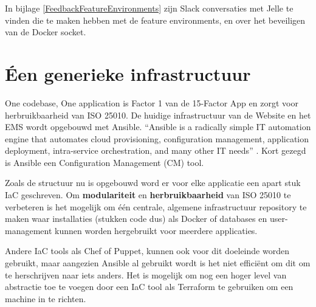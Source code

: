 
In bijlage \ref{FeedbackFeatureEnvironments} zijn Slack conversaties met Jelle te vinden die te maken hebben met de feature environments, en over het beveiligen van de Docker socket.

\section{Éen generieke infrastructuur}
One codebase, One application is Factor 1 van de 15-Factor App en zorgt voor herbruikbaarheid van ISO 25010. De huidige infrastructuur van de Website en het EMS wordt opgebouwd met Ansible. \enquote{Ansible is a radically simple IT automation engine that automates cloud provisioning, configuration management, application deployment, intra-service orchestration, and many other IT needs} \parencite{Ansible}. Kort gezegd is Ansible een Configuration Management (CM) tool.

Zoals de structuur nu is opgebouwd word er voor elke applicatie een apart stuk IaC geschreven. Om \textbf{modulariteit} en \textbf{herbruikbaarheid} van ISO 25010 \parencite{ISO25010} te verbeteren is het mogelijk om één centrale, algemene infrastructuur repository te maken waar installaties (stukken code dus) als Docker of databases en user-management kunnen worden hergebruikt voor meerdere applicaties. 

Andere IaC tools als Chef of Puppet, kunnen ook voor dit doeleinde worden gebruikt, maar aangezien Ansible al gebruikt wordt is het niet efficiënt om dit om te herschrijven naar iets anders. Het is mogelijk om nog een hoger level van abstractie toe te voegen door een IaC tool als Terraform te gebruiken om een machine in te richten.

